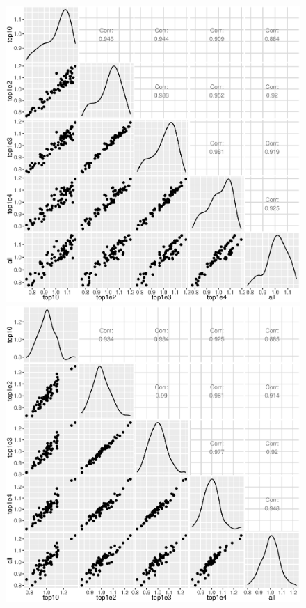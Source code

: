 \documentclass[11pt, a4paper]{article}
\begin{document}
 \begin{figure}[h!]
\begin{center}
\includegraphics[scale=0.2]{Figures/norm1.eps}
\includegraphics[scale=0.2]{Figures/norm2.eps}

\end{center}
\end{figure}
\end{document}
